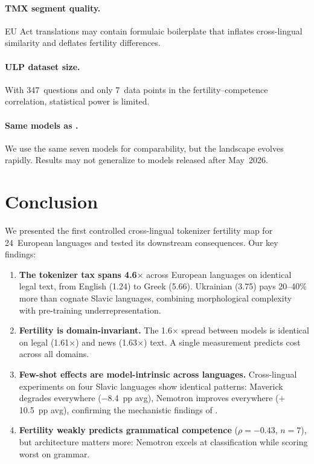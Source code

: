 \documentclass[11pt,a4paper]{article}
\begin{document}
\paragraph{TMX segment quality.} EU Act translations may contain formulaic boilerplate that inflates cross-lingual similarity and deflates fertility differences.

\paragraph{ULP dataset size.} With 347~questions and only 7~data points in the fertility--competence correlation, statistical power is limited.

\paragraph{Same models as \citet{ovcharov2026tokenizer}.} We use the same seven models for comparability, but the landscape evolves rapidly. Results may not generalize to models released after May~2026.

\section{Conclusion}

We presented the first controlled cross-lingual tokenizer fertility map for 24~European languages and tested its downstream consequences. Our key findings:

\begin{enumerate}[leftmargin=*]
    \item \textbf{The tokenizer tax spans 4.6$\times$} across European languages on identical legal text, from English (1.24) to Greek (5.66). Ukrainian (3.75) pays 20--40\% more than cognate Slavic languages, combining morphological complexity with pre-training underrepresentation.

    \item \textbf{Fertility is domain-invariant.} The 1.6$\times$ spread between models is identical on legal (1.61$\times$) and news (1.63$\times$) text. A single measurement predicts cost across all domains.

    \item \textbf{Few-shot effects are model-intrinsic across languages.} Cross-lingual experiments on four Slavic languages show identical patterns: Maverick degrades everywhere ($-$8.4~pp avg), Nemotron improves everywhere ($+$10.5~pp avg), confirming the mechanistic findings of \citet{ovcharov2026fewshot}.

    \item \textbf{Fertility weakly predicts grammatical competence} ($\rho = -0.43$, $n = 7$), but architecture matters more: Nemotron excels at classification while scoring worst on grammar.
\end{enumerate}
\end{document}
